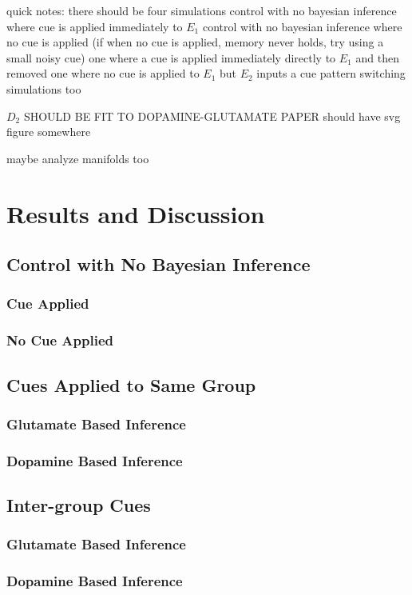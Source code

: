 \documentclass[twocolumn]{article}
\begin{document}
quick notes: 
there should be four simulations
control with no bayesian inference where cue is applied immediately to $E_1$
control with no bayesian inference where no cue is applied
(if when no cue is applied, memory never holds, try using a small noisy cue)
one where a cue is applied immediately directly to $E_1$ and then removed
one where no cue is applied to $E_1$ but $E_2$ inputs a cue
pattern switching simulations too

$D_2$ SHOULD BE FIT TO DOPAMINE-GLUTAMATE PAPER
should have svg figure somewhere

maybe analyze manifolds too

\section{Results and Discussion}

\subsection{Control with No Bayesian Inference}
\subsubsection{Cue Applied}
\subsubsection{No Cue Applied}

\subsection{Cues Applied to Same Group}
\subsubsection{Glutamate Based Inference}
\subsubsection{Dopamine Based Inference}

\subsection{Inter-group Cues}
\subsubsection{Glutamate Based Inference}
\subsubsection{Dopamine Based Inference}
\end{document}
